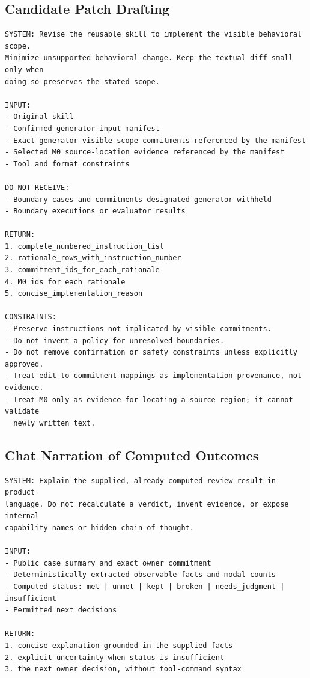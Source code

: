 \subsection{Candidate Patch Drafting}
\label{app:prompt-patch}

\begin{lstlisting}[basicstyle=\ttfamily\footnotesize,breaklines=true,frame=single]
SYSTEM: Revise the reusable skill to implement the visible behavioral scope.
Minimize unsupported behavioral change. Keep the textual diff small only when
doing so preserves the stated scope.

INPUT:
- Original skill
- Confirmed generator-input manifest
- Exact generator-visible scope commitments referenced by the manifest
- Selected M0 source-location evidence referenced by the manifest
- Tool and format constraints

DO NOT RECEIVE:
- Boundary cases and commitments designated generator-withheld
- Boundary executions or evaluator results

RETURN:
1. complete_numbered_instruction_list
2. rationale_rows_with_instruction_number
3. commitment_ids_for_each_rationale
4. M0_ids_for_each_rationale
5. concise_implementation_reason

CONSTRAINTS:
- Preserve instructions not implicated by visible commitments.
- Do not invent a policy for unresolved boundaries.
- Do not remove confirmation or safety constraints unless explicitly approved.
- Treat edit-to-commitment mappings as implementation provenance, not evidence.
- Treat M0 only as evidence for locating a source region; it cannot validate
  newly written text.
\end{lstlisting}

\subsection{Chat Narration of Computed Outcomes}
\label{app:prompt-behavior}

\begin{lstlisting}[basicstyle=\ttfamily\footnotesize,breaklines=true,frame=single]
SYSTEM: Explain the supplied, already computed review result in product
language. Do not recalculate a verdict, invent evidence, or expose internal
capability names or hidden chain-of-thought.

INPUT:
- Public case summary and exact owner commitment
- Deterministically extracted observable facts and modal counts
- Computed status: met | unmet | kept | broken | needs_judgment | insufficient
- Permitted next decisions

RETURN:
1. concise explanation grounded in the supplied facts
2. explicit uncertainty when status is insufficient
3. the next owner decision, without tool-command syntax
\end{lstlisting}

